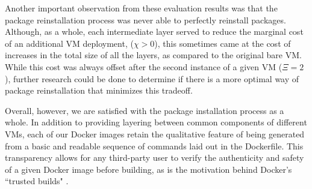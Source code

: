 Another important observation from these evaluation results was that the package reinstallation process was never able to perfectly reinstall packages. Although, as a whole, each intermediate layer served to reduce the marginal cost of an additional VM deployment, ($\chi > 0$), this sometimes came at the cost of increases in the total size of all the layers, as compared to the original bare VM. While this cost was always offset after the second instance of a given VM ($\Xi = 2$), further research could be done to determine if there is a more optimal way of package reinstallation that minimizes this tradeoff. 

Overall, however, we are satisfied with the package installation process as a whole. In addition to providing layering between common components of different VMs, each of our Docker images retain the qualitative feature of being generated from a basic and readable sequence of commands laid out in the Dockerfile. This transparency allows for any third-party user to verify the authenticity and safety of a given Docker image before building, as is the motivation behind Docker's ``trusted builds" \cite{trustedbuilds}.



